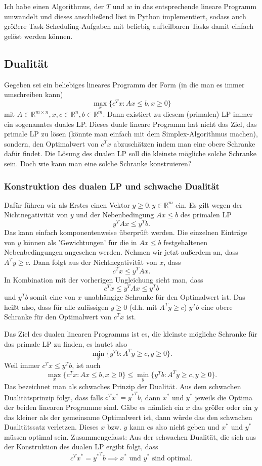 \documentclass{article}
\begin{document}
Ich habe einen Algorithmus, der \(T\) und \(w\) in das entsprechende lineare Programm umwandelt und dieses anschließend löst in Python implementiert, sodass auch größere Task-Scheduling-Aufgaben mit beliebig aufteilbaren Tasks damit einfach gelöst werden können.


\subsection{Dualität}
Gegeben sei ein beliebiges lineares Programm der Form (in die man es immer umschreiben kann)\[
\max_x\{c^Tx:Ax\leq b,x\geq0\}
\]mit \(A\in\mathbb R^{m\times n}, x,c\in\mathbb R^n,b\in\mathbb R^m\). Dann existiert zu diesem (primalen) LP immer ein sogenanntes duales LP. Dieses duale lineare Programm hat nicht das Ziel, das primale LP zu lösen (könnte man einfach mit dem Simplex-Algorithmus machen), sondern, den Optimalwert von \(c^Tx\) abzuschätzen indem man eine obere Schranke dafür findet. Die Lösung des dualen LP soll die kleinste mögliche solche Schranke sein. Doch wie kann man eine solche Schranke konstruieren?

\subsubsection{Konstruktion des dualen LP und schwache Dualität}

Dafür führen wir als Erstes einen Vektor \(y\geq0, y\in\mathbb R^m\) ein. Es gilt wegen der Nichtnegativität von \(y\) und der Nebenbedingung \(Ax\leq b\) des primalen LP\[
y^TAx\leq y^Tb.
\]Das kann einfach komponentenweise überprüft werden. Die einzelnen Einträge von \(y\) können als 'Gewichtungen' für die in \(Ax\leq b\) festgehaltenen Nebenbedingungen angesehen werden. Nehmen wir jetzt außerdem an, dass \(A^Ty\geq c\). Dann folgt aus der Nichtnegativität von \(x\), dass \[
c^Tx\leq y^TAx.
\]In Kombination mit der vorherigen Ungleichung sieht man, dass\[
c^Tx\leq y^TAx\leq y^Tb
\]und \(y^Tb\) somit eine von \(x\) unabhängige Schranke für den Optimalwert ist. Das heißt also, dass für alle zulässigen \(y\geq0\) (d.h. mit \(A^Ty\geq c\)) \(y^Tb\) eine obere Schranke für den Optimalwert von \(c^Tx\) ist. 

Das Ziel des dualen linearen Programms ist es, die kleinste mögliche Schranke für das primale LP zu finden, es lautet also\[
\min_y\{y^Tb:A^Ty\geq c, y\geq0\}.
\]
Weil immer \(c^Tx\leq y^Tb\), ist auch\[
\max_x\{c^Tx:Ax\leq b,x\geq0\} \leq \min_y\{y^Tb:A^Ty\geq c, y\geq0\}.
\]Das bezeichnet man als schwaches Prinzip der Dualität. Aus dem schwachen Dualitätsprinzip folgt, dass falls \(c^Tx^*={y^*}^Tb\), dann \(x^*\) und \(y^*\) jeweils die Optima der beiden linearen Programme sind. Gäbe es nämlich ein \(x\) das größer oder ein \(y\) das kleiner als der gemeinsame Optimalwert ist, dann würde das den schwachen Dualitätssatz verletzen. Dieses \(x\) bzw. \(y\) kann es also nicht geben und \(x^*\) und \(y^*\) müssen optimal sein. Zusammengefasst: Aus der schwachen Dualität, die sich aus der Konstruktion des dualen LP ergibt folgt, dass
\[
c^Tx^*={y^*}^Tb \implies x^* \text{ und } y^*\text{ sind optimal}.
\]
\end{document}
